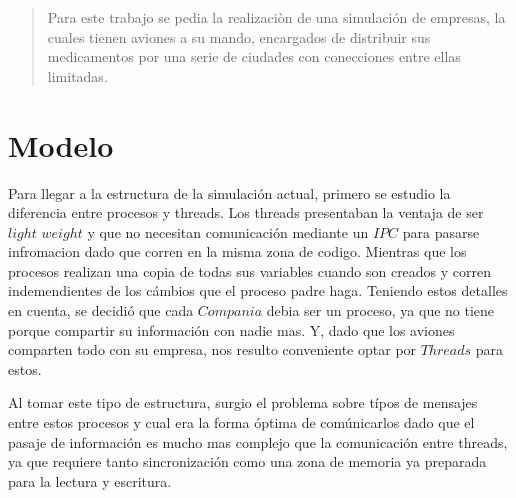 \documentclass[a4paper,12pt,spanish]{article} %
\begin{document}
	
\maketitle
\newpage

\setcounter{page}{1} %
\tableofcontents
\newpage

\begin{abstract}

Para este trabajo se pedia la realizaciòn de una simulación de empresas, la cuales tienen aviones a su mando, encargados de distribuir sus medicamentos por una serie de ciudades con conecciones entre ellas limitadas.

\end{abstract}

\section{Modelo}

Para llegar a la estructura de la simulación actual, primero se estudio
la diferencia entre procesos y threads. Los threads presentaban la
ventaja de ser $light$ $weight$ y que no necesitan comunicación
mediante un $IPC$ para pasarse infromacion dado que corren en la
misma zona de codigo. Mientras que los procesos realizan una copia
de todas sus variables cuando son creados y corren indemendientes
de los cámbios que el proceso padre haga. Teniendo estos detalles
en cuenta, se decidió que cada $Compania$ debia ser un proceso, ya
que no tiene porque compartir su información con nadie mas. Y, dado
que los aviones comparten todo con su empresa, nos resulto conveniente
optar por $Threads$ para estos.

Al tomar este tipo de estructura, surgio el problema sobre típos de
mensajes entre estos procesos y cual era la forma óptima de comúnicarlos
dado que el pasaje de información es mucho mas complejo que la comunicación
entre threads, ya que requiere tanto sincronización como una zona
de memoria ya preparada para la lectura y escritura. \\
\end{document}
